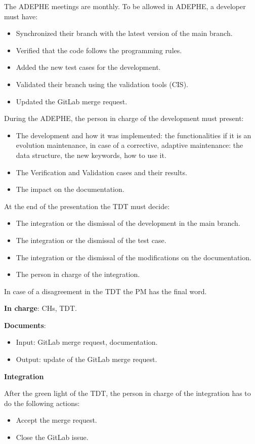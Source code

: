 The ADEPHE meetings are monthly.
To be allowed in ADEPHE, a developer must have:
\begin{itemize}
\item Synchronized their branch with the latest version of the main branch.
\item Verified that the code follows the programming rules.
\item Added the new test cases for the development.
\item Validated their branch using the validation tools (CIS).
\item Updated the GitLab merge request.
\end{itemize}

During the ADEPHE, the person in charge of the development must present:
\begin{itemize}
\item The development and how it was implemented: the functionalities if it is
  an evolution maintenance, in case of a corrective, adaptive maintenance: the
  data structure, the new keywords, how to use it.
\item The Verification and Validation cases and their results.
\item The impact on the documentation.
\end{itemize}

At the end of the presentation the TDT must decide:
\begin{itemize}
\item The integration or the dismissal of the development in the main branch.
\item The integration or the dismissal of the test case.
\item The integration or the dismissal of the modifications on the
documentation.
\item The person in charge of the integration.
\end{itemize}

In case of a disagreement in the TDT the PM has the final word.

\textbf{In charge}: CHs, TDT\@.

\textbf{Documents}:
\begin{itemize}
\item Input: GitLab merge request, documentation.
\item Output: update of the GitLab merge request.
\end{itemize}

\textbf{Integration}

After the green light of the TDT, the person in charge of the integration has
to do the following actions:
\begin{itemize}
\item Accept the merge request.
\item Close the GitLab issue.
\end{itemize}


